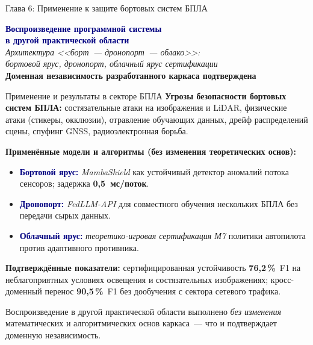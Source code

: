 \documentclass[10pt,aspectratio=169]{beamer}
\newcommand{\hl}[1]{\textcolor{accent}{\textbf{#1}}}
\newcommand{\bn}[1]{\textcolor{navy}{\textbf{#1}}}
\begin{document}
\begin{frame}{Глава 6: Применение к защите бортовых систем БПЛА}
\vspace{1.5cm}
\begin{center}
{\Large\bn{Воспроизведение программной системы\\
в другой практической области}}\\[1cm]

\textit{Архитектура <<борт~--- дронопорт~--- облако>>:\\
бортовой ярус, дронопорт, облачный ярус сертификации}\\[0.4cm]

\textcolor{accent}{\textbf{Доменная независимость
разработанного каркаса подтверждена}}
\end{center}
\end{frame}

\begin{frame}{Применение и результаты в секторе БПЛА}
\small
\textbf{Угрозы безопасности бортовых систем БПЛА:}
состязательные атаки на изображения и LiDAR, физические атаки
(стикеры, окклюзии), отравление обучающих данных,
дрейф распределений сцены, спуфинг GNSS, радиоэлектронная
борьба.
\smallskip

\textbf{Применённые модели и алгоритмы (без изменения
теоретических основ):}
\begin{itemize}\setlength\itemsep{0pt}
\item \bn{Бортовой ярус:} \emph{MambaShield} как
устойчивый детектор аномалий потока сенсоров; задержка
\hl{0{,}5~мс/поток}.
\item \bn{Дронопорт:} \emph{FedLLM-API} для совместного
обучения нескольких БПЛА без передачи сырых данных.
\item \bn{Облачный ярус:} \emph{теоретико-игровая
сертификация М7} политики автопилота против адаптивного
противника.
\end{itemize}
\smallskip

\textbf{Подтверждённые показатели:}
сертифицированная устойчивость \hl{76{,}2\,\%}~F1 на
неблагоприятных условиях освещения и состязательных
изображениях; кросс-доменный перенос \hl{90{,}5\,\%}~F1
без дообучения с сектора сетевого трафика.
\medskip

\begin{block}{}
\footnotesize Воспроизведение в другой практической области
выполнено \emph{без изменения} математических и
алгоритмических основ каркаса~--- что и подтверждает
доменную независимость.
\end{block}
\end{frame}
\end{document}
